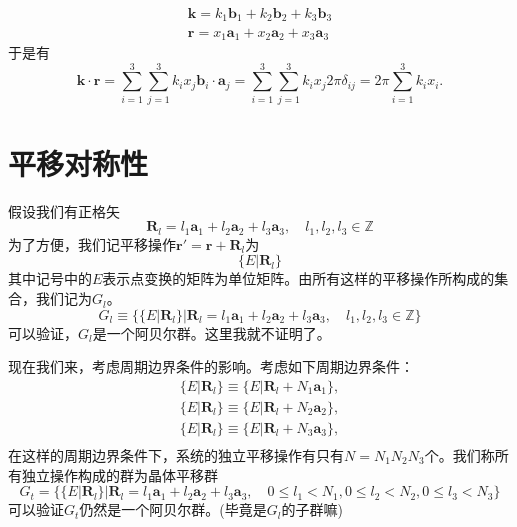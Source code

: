 \begin{align}
        \mathbf{k} = k_1 \mathbf{b}_1 + k_2 \mathbf{b}_2 + k_3 \mathbf{b}_3 \\
        \mathbf{r} = x_1 \mathbf{a}_1 + x_2 \mathbf{a}_2 + x_3 \mathbf{a}_3
\end{align}
于是有
\begin{equation}
    \mathbf{k}\cdot \mathbf{r} = \sum_{i = 1}^3 \sum_{j=1}^3 k_ix_j \mathbf{b}_i \cdot \mathbf{a}_j = \sum_{i = 1}^3 \sum_{j=1}^3k_ix_j 2\pi \delta_{ij} = 2\pi \sum_{i=1}^3 k_i x_i.
\end{equation}

\section{平移对称性}
假设我们有正格矢
\begin{equation}
    \mathbf{R}_l = l_1 \mathbf{a}_1 + l_2 \mathbf{a}_2 + l_3 \mathbf{a}_3,\quad l_1,l_2,l_3 \in \mathbb{Z} 
\end{equation}
为了方便，我们记平移操作$\mathbf{r}' = \mathbf{r} + \mathbf{R}_l$为
\begin{equation}
    \{E|\mathbf{R}_l\}
\end{equation}
其中记号中的$E$表示点变换的矩阵为单位矩阵。由所有这样的平移操作所构成的集合，我们记为$G_l$。
\begin{equation}
    G_l \equiv \{ \{E|\mathbf{R}_l\}| \mathbf{R}_l = l_1 \mathbf{a}_1 + l_2 \mathbf{a}_2 + l_3 \mathbf{a}_3,\quad l_1,l_2,l_3 \in \mathbb{Z}  \}
\end{equation}
可以验证，$G_l$是一个阿贝尔群。这里我就不证明了。
\par 现在我们来，考虑周期边界条件的影响。考虑如下周期边界条件：
\begin{align}
    \{E|\mathbf{R}_l\} \equiv \{E|\mathbf{R}_l + N_1 \mathbf{a}_1\},\\
    \{E|\mathbf{R}_l\} \equiv \{E|\mathbf{R}_l + N_2 \mathbf{a}_2\},\\
    \{E|\mathbf{R}_l\} \equiv \{E|\mathbf{R}_l + N_3 \mathbf{a}_3\},\\
\end{align}
在这样的周期边界条件下，系统的独立平移操作有只有$N = N_1N_2N_3$个。我们称所有独立操作构成的群为晶体平移群
\begin{equation}
    G_t = \{ \{E|\mathbf{R}_l\}| \mathbf{R}_l = l_1 \mathbf{a}_1 + l_2 \mathbf{a}_2 + l_3 \mathbf{a}_3,\quad 0\leq l_1<N_1,0\leq l_2 <N_2, 0\leq l_3<N_3  \}
\end{equation}
可以验证$G_t$仍然是一个阿贝尔群。(毕竟是$G_l$的子群嘛)
